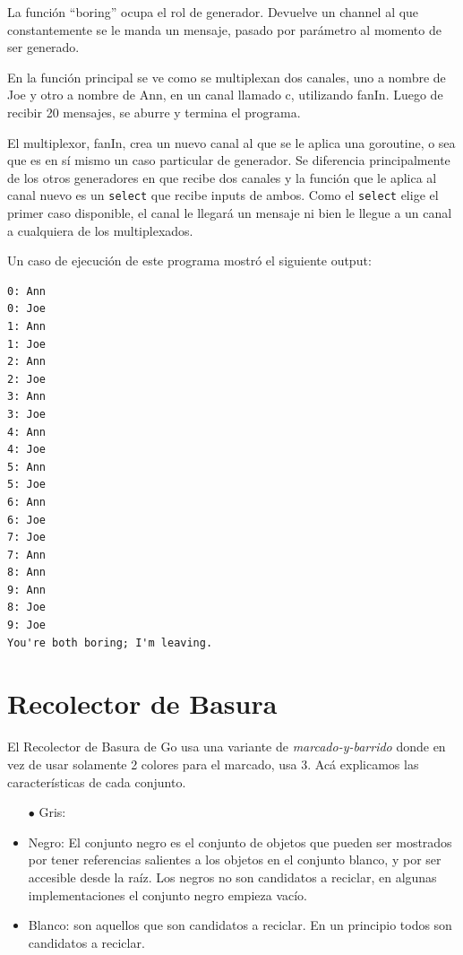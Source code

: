 \documentclass{article}
\begin{document}
La función ``boring'' ocupa el rol de generador. Devuelve un channel al que constantemente se le manda un mensaje, pasado por parámetro al momento de ser generado.

En la función principal se ve como se multiplexan dos canales, uno a nombre de Joe y otro a nombre de Ann, en un canal llamado c, utilizando fanIn. Luego de recibir 20 mensajes, se aburre y termina el programa.

El multiplexor, fanIn, crea un nuevo canal al que se le aplica una goroutine, o sea que es en sí mismo un caso particular de generador. Se diferencia principalmente de los otros generadores en que recibe dos canales y la función que le aplica al canal nuevo es un \lstinline|select| que recibe inputs de ambos. Como el \lstinline|select| elige el primer caso disponible, el canal le llegará un mensaje ni bien le llegue a un canal a cualquiera de los multiplexados.

Un caso de ejecución de este programa mostró el siguiente output:
\begin{verbatim}
0: Ann 
0: Joe 
1: Ann 
1: Joe 
2: Ann 
2: Joe 
3: Ann 
3: Joe 
4: Ann 
4: Joe 
5: Ann 
5: Joe 
6: Ann 
6: Joe 
7: Joe 
7: Ann 
8: Ann 
9: Ann 
8: Joe 
9: Joe 
You're both boring; I'm leaving.
\end{verbatim}

\section{Recolector de Basura}
El Recolector de Basura de Go usa una variante de \textit{marcado-y-barrido} donde en vez de usar solamente 2 colores para el marcado, usa 3. 
Acá explicamos las características de cada conjunto.
\begin{itemize}
	\item[$\bullet$] Gris:
	\item Negro: El conjunto negro es el conjunto de objetos que pueden ser mostrados por tener referencias salientes a los objetos en el conjunto blanco, y por ser accesible desde la raíz. Los negros no son candidatos a reciclar, en algunas implementaciones el conjunto negro empieza vacío. 
	\item Blanco: son aquellos que son candidatos a reciclar. En un principio todos son candidatos a reciclar. 
\end{itemize}
\end{document}
